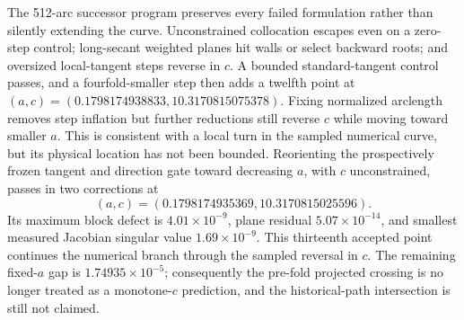 The 512-arc successor program preserves every failed formulation rather than
silently extending the curve.  Unconstrained collocation escapes even on a
zero-step control; long-secant weighted planes hit walls or select backward
roots; and oversized local-tangent steps reverse in $c$.  A bounded
standard-tangent control passes, and a fourfold-smaller step then adds a
twelfth point at
$(a,c)=(0.1798174938833,10.3170815075378)$.  Fixing normalized arclength removes
step inflation but further reductions still reverse $c$ while moving toward
smaller $a$.  This is consistent with a local turn in the sampled numerical
curve, but its physical location has not been bounded.  Reorienting the
prospectively frozen tangent and direction
gate toward decreasing $a$, with $c$ unconstrained, passes in two corrections
at
\[
  (a,c)=(0.1798174935369,10.3170815025596).
\]
Its maximum block defect is $4.01\times10^{-9}$, plane residual
$5.07\times10^{-14}$, and smallest measured Jacobian singular value
$1.69\times10^{-9}$.  This thirteenth accepted point continues the numerical
branch through the sampled reversal in $c$.  The remaining fixed-$a$ gap is
$1.74935\times10^{-5}$; consequently the pre-fold projected crossing is no
longer treated as a monotone-$c$ prediction, and the historical-path
intersection is still not claimed.

